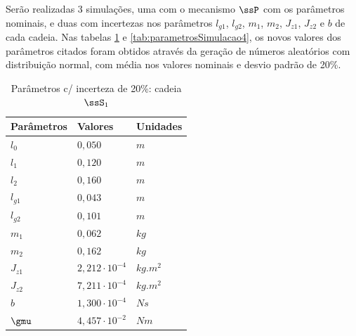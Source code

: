 \documentclass[]{politex}
\begin{document}
Serão realizadas 3 simulações, uma com o mecanismo $\ssP$ com os parâmetros nominais, e duas com incertezas nos parâmetros $l_{g1}$, $l_{g2}$, $m_1$, $m_2$, $J_{z1}$, $J_{z2}$ e $b$ de cada cadeia.  Nas tabelas \ref{tab:parametrosSimulacao3} e \ref{tab:parametrosSimulacao4}, os novos valores dos parâmetros citados foram obtidos através da geração de números aleatórios com distribuição normal, com média nos valores nominais e desvio padrão de 20\%.
\begin{multicols}{2}
\begin{table}[H] 
\centering
\caption{Parâmetros c/ incerteza de 20\%: cadeia $\ssS_1$}
\label{tab:parametrosSimulacao3}
\begin{tabular}{l|l|l}
Parâmetros   & Valores                  & Unidades      \\ \hline
$l_0$        & $0{,}050$                     & $m$        \\
$l_1$        & $0{,}120$                     & $m$        \\
$l_2$        & $0{,}160$                     & $m$        \\
$l_{g1}$     & $0{,}043$                     & $m$        \\
$l_{g2}$     & $0{,}101$                     & $m$        \\
$m_1$        & $0{,}062$                     & $kg$       \\
$m_2$        & $0{,}162$                     & $kg$       \\
$J_{z1}$     & $2{,}212 \cdot 10^{-4}$       & $kg.m^{2}$ \\
$J_{z2}$     & $7{,}211 \cdot 10^{-4}$       & $kg.m^{2}$ \\
$b$          & $1{,}300 \cdot 10^{-4}$       & $N s$      \\
$\gmu$       & $4{,}457 \cdot 10^{-2}$       & $Nm$        \\
\end{tabular}
\end{table} 


\end{multicols}
\end{document}
